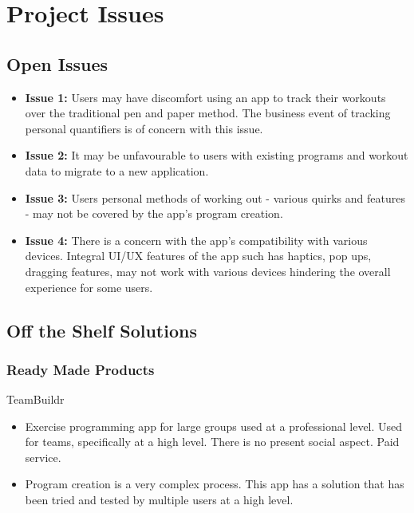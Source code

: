 \documentclass[12pt]{article}
\begin{document}
	\newpage
	
	\section{Project Issues}
		\subsection{Open Issues}
			\begin{itemize}
				\item \textbf{Issue 1:} Users may have discomfort using an app to track their workouts over the traditional pen and paper method. The business event of tracking personal quantifiers is of concern with this issue.
				
				\item \textbf{Issue 2:} It may be unfavourable to users with existing programs and workout data to migrate to a new application.
				
				\item \textbf{Issue 3:} Users personal methods of working out - various quirks and features - may not be covered by the app's program creation.
				
				\item \textbf{Issue 4:} There is a concern with the app’s compatibility with various devices. Integral UI/UX features of the app such has haptics, pop ups, dragging features, may not work with various devices hindering the overall experience for some users.
				
			\end{itemize}
		
		\subsection{Off the Shelf Solutions}
			\subsubsection{Ready Made Products}
		
				\noindent TeamBuildr
				\begin{itemize}
				\item Exercise programming app for large groups used at a professional level. Used for teams, specifically at a high level. There is no present social aspect. Paid service. 
				\item Program creation is a very complex process. This app has a solution that has been tried and tested by multiple users at a high level. 
				\end{itemize}
				
\end{document}
